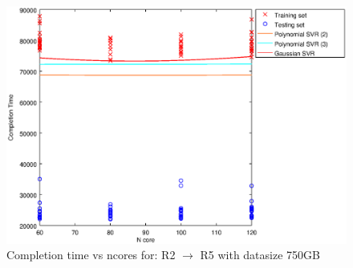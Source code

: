 
\begin {figure}[hbtp]
\centering
\includegraphics[width=\textwidth]{output/R2_R5_750_ALL_FEATURES/plot_R2_R5_750_bestmodels.eps}
\caption{Completion time vs ncores for: R2 $\rightarrow$ R5 with datasize 750GB}
\label{fig:coreonly_linear_R2_R5_750}
\end {figure}
